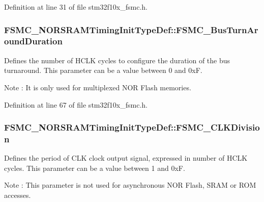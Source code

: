Definition at line 31 of file stm32f10x\+\_\+fsmc.\+h.

\subsubsection[{\texorpdfstring{F\+S\+M\+C\+\_\+\+Bus\+Turn\+Around\+Duration}{FSMC_BusTurnAroundDuration}}]{ F\+S\+M\+C\+\_\+\+N\+O\+R\+S\+R\+A\+M\+Timing\+Init\+Type\+Def\+::\+F\+S\+M\+C\+\_\+\+Bus\+Turn\+Around\+Duration}\hypertarget{struct_f_s_m_c___n_o_r_s_r_a_m_timing_init_type_def_a3d98d57618e46ec6aa5d876dcc047d32}{}\label{struct_f_s_m_c___n_o_r_s_r_a_m_timing_init_type_def_a3d98d57618e46ec6aa5d876dcc047d32}
Defines the number of H\+C\+LK cycles to configure the duration of the bus turnaround. This parameter can be a value between 0 and 0xF. \begin{DoxyNote}{Note}
\+: It is only used for multiplexed N\+OR Flash memories. 
\end{DoxyNote}


Definition at line 67 of file stm32f10x\+\_\+fsmc.\+h.

\subsubsection[{\texorpdfstring{F\+S\+M\+C\+\_\+\+C\+L\+K\+Division}{FSMC_CLKDivision}}]{ F\+S\+M\+C\+\_\+\+N\+O\+R\+S\+R\+A\+M\+Timing\+Init\+Type\+Def\+::\+F\+S\+M\+C\+\_\+\+C\+L\+K\+Division}\hypertarget{struct_f_s_m_c___n_o_r_s_r_a_m_timing_init_type_def_a78bdec78fe90681fcadda5424a8ba606}{}\label{struct_f_s_m_c___n_o_r_s_r_a_m_timing_init_type_def_a78bdec78fe90681fcadda5424a8ba606}
Defines the period of C\+LK clock output signal, expressed in number of H\+C\+LK cycles. This parameter can be a value between 1 and 0xF. \begin{DoxyNote}{Note}
\+: This parameter is not used for asynchronous N\+OR Flash, S\+R\+AM or R\+OM accesses. 
\end{DoxyNote}


